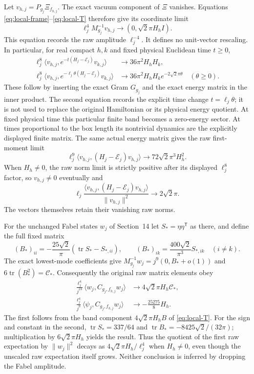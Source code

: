 Let $v_{h,j}=P_{g_j}\Xi_{f_{h,j}}$. The exact vacuum component
of $\Xi$ vanishes. Equations \eqref{eq:local-frame}--\eqref{eq:local-T}
therefore give its coordinate limit
\[
 \ell_j^4M_{g_j}^{-1}v_{h,j}
 \longrightarrow(0,\sqrt2\pi H_hI).
\]
This equation records the raw amplitude $\ell_j^{-4}$.
It defines no unit-vector rescaling. In particular, for real compact
$h,k$ and fixed physical Euclidean time $t\ge0$,
\begin{align}
 \ell_j^8\langle v_{h,j},e^{-t(H_j-\mathcal E_j)}v_{k,j}\rangle
 &\longrightarrow36\pi^2H_hH_k,\label{eq:local-fixed-time}\\
 \ell_j^8\langle v_{h,j},
       e^{-\ell_j\theta(H_j-\mathcal E_j)}v_{k,j}\rangle
 &\longrightarrow36\pi^2H_hH_k e^{-2\sqrt2\pi\theta}
 \quad(\theta\ge0).\label{eq:local-slow-time}
\end{align}
These follow by inserting the exact Gram $G_{g_j}$ and the exact
energy matrix in the inner product. The second equation records
the explicit time change $t=\ell_j\theta$; it is not used to replace
the original Hamiltonian or its physical energy quotient.
At fixed physical time this particular finite band becomes a
zero-energy sector. At times proportional to the box length its
nontrivial dynamics are the explicitly displayed finite matrix.
The same actual energy matrix gives the raw first-moment limit
\[
 \ell_j^9\langle v_{h,j},(H_j-\mathcal E_j)v_{h,j}\rangle
 \longrightarrow72\sqrt2\pi^3H_h^2.
\]
When $H_h\ne0$, the raw norm limit is strictly positive after its
displayed $\ell_j^8$ factor, so $v_{h,j}\ne0$ eventually and
\[
 \ell_j\frac{\langle v_{h,j},(H_j-\mathcal E_j)v_{h,j}\rangle}
                   {\|v_{h,j}\|^2}\longrightarrow2\sqrt2\pi.
\]
The vectors themselves retain their vanishing raw norms.

For the unchanged Fabel states $w_j$ of Section~14 let
$S_*=\eta\eta^{\mathsf T}$ as there, and define the full fixed matrix
\[
 (B_*)_{ii}=-\frac{25\sqrt2}{\pi}
                    (\operatorname{tr}S_*-S_{*,ii}),\qquad
 (B_*)_{ik}=\frac{400\sqrt2}{\pi^3}S_{*,ik}\quad(i\ne k).
\]
The exact lowest-mode coefficients give
$M_{g_j}^{-1}w_j=j^9(0,B_*+o(1))$ and
$6\operatorname{tr}(B_*^2)=\mathcal C_*$.
Consequently the original raw matrix elements obey
\begin{align}
 \frac{\ell_j^4}{j^{18}}
 \langle w_j,C_{g_j,f_{h,j}}w_j\rangle
 &\longrightarrow4\sqrt2\pi H_h\mathcal C_*,
 \label{eq:local-fabel-diag}\\
 \frac{\ell_j^4}{j^9}
 \langle\psi_j,C_{g_j,f_{h,j}}w_j\rangle
 &\longrightarrow-\frac{25275}{8}H_h.
 \label{eq:local-fabel-mixed}
\end{align}
The first follows from the band component $4\sqrt2\pi H_hB$ of
\eqref{eq:local-T}. For the sign and constant in the second,
$\operatorname{tr}S_*=337/64$ and
$\operatorname{tr}B_*=-8425\sqrt2/(32\pi)$; multiplication by
$6\sqrt2\pi H_h$ yields the result.
Thus the quotient of the first raw expectation by $\|w_j\|^2$
decays as $4\sqrt2\pi H_h/\ell_j^4$ when $H_h\ne0$,
even though the unscaled raw expectation itself grows.
Neither conclusion is inferred by dropping the Fabel amplitude.


